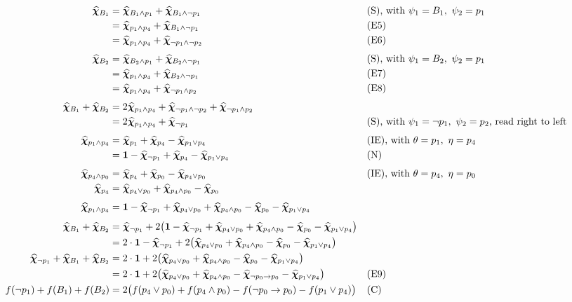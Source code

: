 \documentclass[titlepage,a4paper,11pt]{report}
\begin{document}
    \begin{align*}
        \bm{\widehat\chi}_{B_1}
        &=\bm{\widehat\chi}_{B_1\land p_1}+\bm{\widehat\chi}_{B_1\land\neg p_1}
        &&\text{(S), with }\psi_1=B_1,\ \psi_2=p_1\\
        &=\bm{\widehat\chi}_{p_1\land p_4}+\bm{\widehat\chi}_{B_1\land\neg p_1}
        &&\text{(E5)}\\
        &=\bm{\widehat\chi}_{p_1\land p_4}+\bm{\widehat\chi}_{\neg p_1\land\neg p_2}
        &&\text{(E6)}\\[4pt]
        \bm{\widehat\chi}_{B_2}
        &=\bm{\widehat\chi}_{B_2\land p_1}+\bm{\widehat\chi}_{B_2\land\neg p_1}
        &&\text{(S), with }\psi_1=B_2,\ \psi_2=p_1\\
        &=\bm{\widehat\chi}_{p_1\land p_4}+\bm{\widehat\chi}_{B_2\land\neg p_1}
        &&\text{(E7)}\\
        &=\bm{\widehat\chi}_{p_1\land p_4}+\bm{\widehat\chi}_{\neg p_1\land p_2}
        &&\text{(E8)}\\[4pt]
        \bm{\widehat\chi}_{B_1}+\bm{\widehat\chi}_{B_2}
        &=2\bm{\widehat\chi}_{p_1\land p_4}+\bm{\widehat\chi}_{\neg p_1\land\neg p_2}+\bm{\widehat\chi}_{\neg p_1\land p_2}\\
        &=2\bm{\widehat\chi}_{p_1\land p_4}+\bm{\widehat\chi}_{\neg p_1}
        &&\text{(S), with }\psi_1=\neg p_1,\ \psi_2=p_2\text{, read right to left}\\[4pt]
        \bm{\widehat\chi}_{p_1\land p_4}
        &=\bm{\widehat\chi}_{p_1}+\bm{\widehat\chi}_{p_4}-\bm{\widehat\chi}_{p_1\lor p_4}
        &&\text{(IE), with }\theta=p_1,\ \eta=p_4\\
        &=\mathbf 1-\bm{\widehat\chi}_{\neg p_1}+\bm{\widehat\chi}_{p_4}-\bm{\widehat\chi}_{p_1\lor p_4}
        &&\text{(N)}\\[4pt]
        \bm{\widehat\chi}_{p_4\land p_0}
        &=\bm{\widehat\chi}_{p_4}+\bm{\widehat\chi}_{p_0}-\bm{\widehat\chi}_{p_4\lor p_0}
        &&\text{(IE), with }\theta=p_4,\ \eta=p_0\\
        \bm{\widehat\chi}_{p_4}
        &=\bm{\widehat\chi}_{p_4\lor p_0}+\bm{\widehat\chi}_{p_4\land p_0}-\bm{\widehat\chi}_{p_0}\\[4pt]
        \bm{\widehat\chi}_{p_1\land p_4}
        &=\mathbf 1-\bm{\widehat\chi}_{\neg p_1}+\bm{\widehat\chi}_{p_4\lor p_0}+\bm{\widehat\chi}_{p_4\land p_0}-\bm{\widehat\chi}_{p_0}-\bm{\widehat\chi}_{p_1\lor p_4}\\[4pt]
        \bm{\widehat\chi}_{B_1}+\bm{\widehat\chi}_{B_2}
        &=\bm{\widehat\chi}_{\neg p_1}+2\bigl(\mathbf 1-\bm{\widehat\chi}_{\neg p_1}+\bm{\widehat\chi}_{p_4\lor p_0}+\bm{\widehat\chi}_{p_4\land p_0}-\bm{\widehat\chi}_{p_0}-\bm{\widehat\chi}_{p_1\lor p_4}\bigr)\\
        &=2\cdot\mathbf 1-\bm{\widehat\chi}_{\neg p_1}+2\bigl(\bm{\widehat\chi}_{p_4\lor p_0}+\bm{\widehat\chi}_{p_4\land p_0}-\bm{\widehat\chi}_{p_0}-\bm{\widehat\chi}_{p_1\lor p_4}\bigr)\\
        \bm{\widehat\chi}_{\neg p_1}+\bm{\widehat\chi}_{B_1}+\bm{\widehat\chi}_{B_2}
        &=2\cdot\mathbf 1+2\bigl(\bm{\widehat\chi}_{p_4\lor p_0}+\bm{\widehat\chi}_{p_4\land p_0}-\bm{\widehat\chi}_{p_0}-\bm{\widehat\chi}_{p_1\lor p_4}\bigr)\\
        &=2\cdot\mathbf 1+2\bigl(\bm{\widehat\chi}_{p_4\lor p_0}+\bm{\widehat\chi}_{p_4\land p_0}-\bm{\widehat\chi}_{\neg p_0\to p_0}-\bm{\widehat\chi}_{p_1\lor p_4}\bigr)
        &&\text{(E9)}\\
        f(\neg p_1)+f(B_1)+f(B_2)
        &=2\bigl(f(p_4\lor p_0)+f(p_4\land p_0)-f(\neg p_0\to p_0)-f(p_1\lor p_4)\bigr)
        &&\text{(C)}
    \end{align*}
\end{document}
